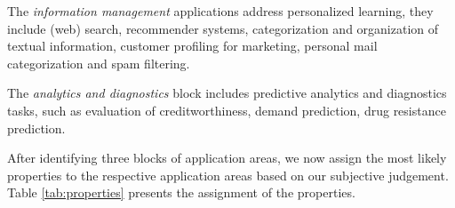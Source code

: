 \documentclass{llncs}
\begin{document}
The \emph{information management} applications address personalized learning, they include (web) search, recommender systems, categorization and organization of textual information, customer profiling for marketing, personal mail categorization and spam filtering.

The \emph{analytics and diagnostics} block includes predictive analytics and diagnostics tasks, such as evaluation of creditworthiness, demand prediction, drug resistance prediction.





After identifying three blocks of application areas,
we now assign the most likely properties to the respective application areas based on our subjective judgement. Table \ref{tab:properties} presents the assignment of the properties.
\end{document}
